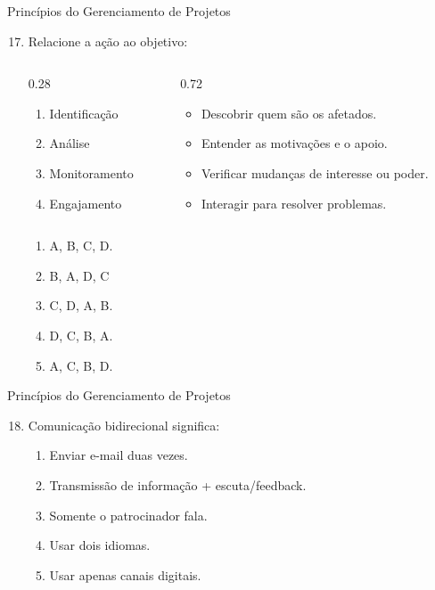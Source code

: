 \documentclass{beamer}
\begin{document}
\begin{frame}{Princípios do Gerenciamento de Projetos}
	\begin{enumerate}
		\setcounter{enumi}{16}
		\justifying
		\item Relacione a ação ao objetivo:
		\begin{columns}
			\begin{column}{0.28\textwidth}
				\begin{enumerate}[A]
					\item Identificação
					\item Análise
					\item Monitoramento
					\item Engajamento
				\end{enumerate}
			\end{column}
			\begin{column}{0.72\textwidth}
				\begin{itemize}
					\item Descobrir quem são os afetados.
					\item Entender as motivações e o apoio.
					\item Verificar mudanças de interesse ou poder.
					\item Interagir para resolver problemas.
				\end{itemize}
			\end{column}
		\end{columns}
		\begin{enumerate}[a]
			\item A, B, C, D.
			\item \alert<2>{B, A, D, C}
			\item C, D, A, B.
			\item D, C, B, A.
			\item A, C, B, D.
		\end{enumerate}
	\end{enumerate}
\end{frame}

\begin{frame}{Princípios do Gerenciamento de Projetos}
	\begin{enumerate}
		\setcounter{enumi}{17}
		\justifying
		\item Comunicação bidirecional significa:
		\begin{enumerate}[a]
			\item Enviar e-mail duas vezes.
			\item \alert<2>{Transmissão de informação + escuta/feedback.}
			\item Somente o patrocinador fala.
			\item Usar dois idiomas.
			\item Usar apenas canais digitais.
		\end{enumerate}
	\end{enumerate}
\end{frame}
\end{document}
